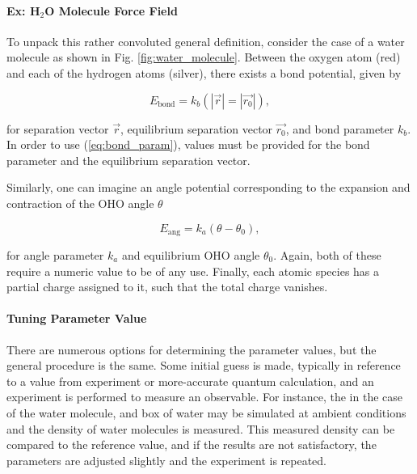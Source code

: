     
            \paragraph{Ex: H$_2$O Molecule Force Field}
    
            To unpack this rather convoluted general definition, consider the case of a water molecule as shown in Fig. \ref{fig:water_molecule}. Between the oxygen atom (red) and each of the hydrogen atoms (silver), there exists a bond potential, given by
            
            \begin{equation}
            \label{eq:bond_param}
                E_\text{bond} = k_b(|\vec{r}|=|\vec{r_0}|),
            \end{equation}
            
            \noindent for separation vector $\vec{r}$, equilibrium separation vector $\vec{r_0}$, and bond parameter $k_b$. In order to use (\ref{eq:bond_param}), values must be provided for the bond parameter and the equilibrium separation vector.
            
            Similarly, one can imagine an angle potential corresponding to the expansion and contraction of the OHO angle $\theta$
            
            \begin{equation}
                E_\text{ang} = k_a(\theta - \theta_0),
            \end{equation}
            
            \noindent for angle parameter $k_a$ and equilibrium OHO angle $\theta_0$. Again, both of these require a numeric value to be of any use. Finally, each atomic species has a partial charge assigned to it, such that the total charge vanishes.
            
            \paragraph{Tuning Parameter Value} There are numerous options for determining the parameter values, but the general procedure is the same. Some initial guess is made, typically in reference to a value from experiment or more-accurate quantum calculation, and an experiment is performed to measure an observable. For instance, the in the case of the water molecule, and box of water may be simulated at ambient conditions and the density of water molecules is measured. This measured density can be compared to the reference value, and if the results are not satisfactory, the parameters are adjusted slightly and the experiment is repeated.
            
